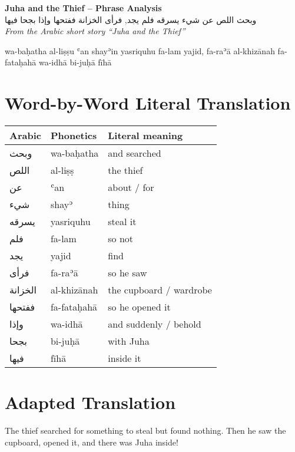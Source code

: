 \documentclass[a4paper,12pt]{article}
\begin{document}
\begin{center}
    {\Huge \bfseries Juha and the Thief – Phrase Analysis}\\[4pt]
    {\Large \textarabic{وبحث اللص عن شيء يسرقه فلم يجد, فرأى الخزانة ففتحها وإذا بجحا فيها}}\\[6pt]
    \emph{From the Arabic short story “Juha and the Thief”}
\end{center}

\begin{tcolorbox}[colback=sectionbg, colframe=accent, title=Phonetic Transcription]
\begin{spacing}{1.2}
wa-baḥatha al-liṣṣu ʿan shayʾin yasriquhu fa-lam yajid, fa-raʾā al-khizānah fa-fataḥahā wa-idhā bi-juḥā fīhā
\end{spacing}
\end{tcolorbox}

\section{Word-by-Word Literal Translation}
\renewcommand{\arraystretch}{1.4}
\begin{tabular}{|>{\arabicfont}m{3cm}|m{4.5cm}|m{7cm}|}
\hline
\rowcolor{tableheader} Arabic & Phonetics & Literal meaning \\
\hline
وبحث & wa-baḥatha & and searched \\
اللص & al-liṣṣ & the thief \\
عن & ʿan & about / for \\
شيء & shayʾ & thing \\
يسرقه & yasriquhu & steal it \\
فلم & fa-lam & so not \\
يجد & yajid & find \\
فرأى & fa-raʾā & so he saw \\
الخزانة & al-khizānah & the cupboard / wardrobe \\
ففتحها & fa-fataḥahā & so he opened it \\
وإذا & wa-idhā & and suddenly / behold \\
بجحا & bi-juḥā & with Juha \\
فيها & fīhā & inside it \\
\hline
\end{tabular}

\section{Adapted Translation}
\begin{tcolorbox}[colback=sectionbg]
The thief searched for something to steal but found nothing. Then he saw the cupboard, opened it, and there was Juha inside!
\end{tcolorbox}
\end{document}
